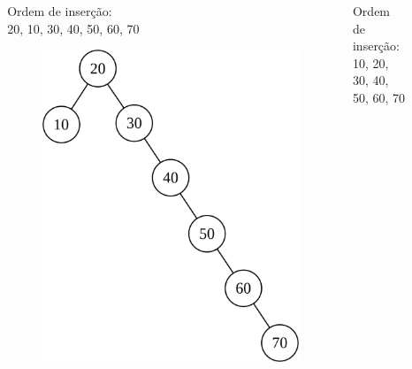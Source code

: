 \documentclass[aspectratio=169]{beamer}
\begin{document}
\begin{frame}
\begin{columns}[T]
\begin{column}{0.25\linewidth}
\begin{figure}[h]
\end{figure}
\end{column}
\begin{column}{0.25\linewidth}
\scriptsize{Ordem de inserção:\\
20, 10, 30, 40, 50, 60, 70}
\begin{figure}[h]
	\centering
	\includegraphics[height=0.45\paperheight]{imagens/avl04.png}
\end{figure}
\end{column}
\begin{column}{0.25\linewidth}
\scriptsize{Ordem de inserção:\\
10, 20, 30, 40, 50, 60, 70}
\begin{figure}[h]
	\centering

\end{figure}
\end{column}
\end{columns}
\end{frame}
\end{document}
